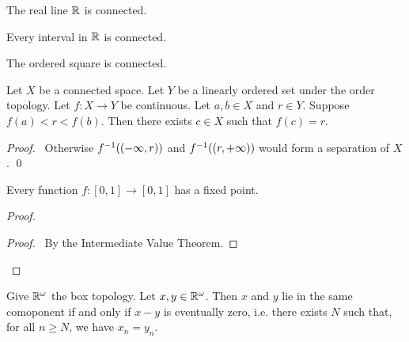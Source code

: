 \begin{corollary}
    The real line $\mathbb{R}$ is connected.
\end{corollary}

\begin{corollary}
    \label{corollary:connected_interval}
    Every interval in $\mathbb{R}$ is connected.
\end{corollary}

\begin{corollary}
    The ordered square is connected.
\end{corollary}

\begin{theorem}
    Let $X$ be a connected space. Let $Y$ be a linearly ordered set under the order topology. Let $f : X \rightarrow Y$ be continuous.
    Let $a, b \in X$ and $r \in Y$. Suppose $f(a) < r < f(b)$. Then there exists $c \in X$ such that $f(c) = r$.
\end{theorem}

\begin{proof}
    \pf\ Otherwise ${f}^{-1}((- \infty, r))$ and ${f}^{-1}((r, + \infty))$ would form a separation of $X$. \qed
\end{proof}

\begin{proposition}
    Every function $f : [0,1] \rightarrow [0,1]$ has a fixed point.
\end{proposition}

\begin{proof}
    \pf
    \begin{proof}
        \pf\ By the Intermediate Value Theorem.
    \end{proof}
\end{proof}

\begin{proposition}
    Give $\mathbb{R}^\omega$ the box topology. Let $x, y \in \mathbb{R}^\omega$. Then $x$ and $y$ lie in the same comoponent if and only if $x-y$ is eventually zero, i.e.
    there exists $N$ such that, for all $n \geq N$,
    we have $x_n = y_n$.
\end{proposition}

